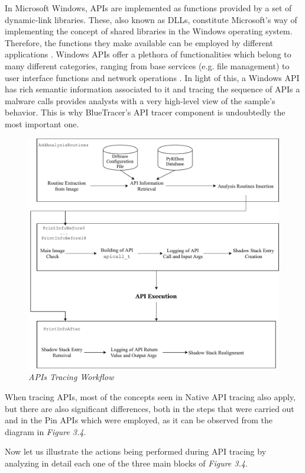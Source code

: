 In Microsoft Windows, APIs are implemented as functions provided by a set of dynamic-link libraries. These, also known as DLLs, constitute Microsoft's way of implementing the concept of shared libraries in the Windows operating system. Therefore, the functions they make available can be employed by different applications \cite{DLL}. Windows APIs offer a plethora of functionalities which belong to many different categories, ranging from base services (e.g. file management) to user interface functions and network operations \cite{WinAPI}. In light of this, a Windows API has rich semantic information associated to it and tracing the sequence of APIs a malware calls provides analysts with a very high-level view of the sample's behavior. This is why BlueTracer's API tracer component is undoubtedly the most important one. 
\\
\begin{figure}[h]
\centering
\includegraphics[scale=0.662]{Figures/APITracing.pdf}
\caption{\textit{APIs Tracing Workflow}}
\end{figure}

 
When tracing APIs, most of the concepts seen in Native API tracing also apply, but there are also significant differences, both in the steps that were carried out and in the Pin APIs which were employed, as it can be observed from the diagram in \textit{Figure 3.4}.

Now let us illustrate the actions being performed during API tracing by analyzing in detail each one of the three main blocks of \textit{Figure 3.4}.

